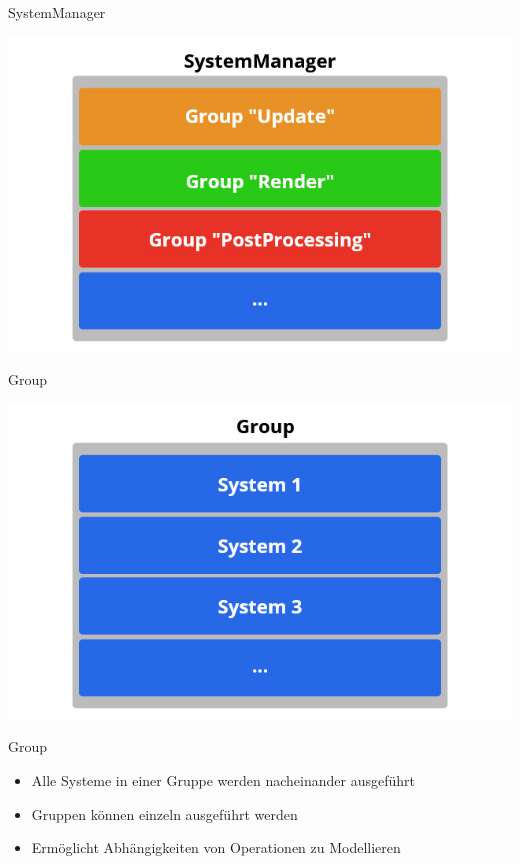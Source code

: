 \documentclass{presentation}
\begin{document}
\begin{frame}{SystemManager}
    \begin{center}
        \includegraphics[width=\textwidth]{systemmanager_structure.jpg}
    \end{center}
\end{frame}

\begin{frame}{Group}
    \begin{center}
        \includegraphics[width=\textwidth]{group_structure.jpg}
    \end{center}
\end{frame}

\begin{frame}{Group}
    \begin{itemize}
        \item Alle Systeme in einer Gruppe werden nacheinander ausgeführt
        \item Gruppen können einzeln ausgeführt werden
        \item Ermöglicht Abhängigkeiten von Operationen zu Modellieren
    \end{itemize}
\end{frame}
\end{document}
